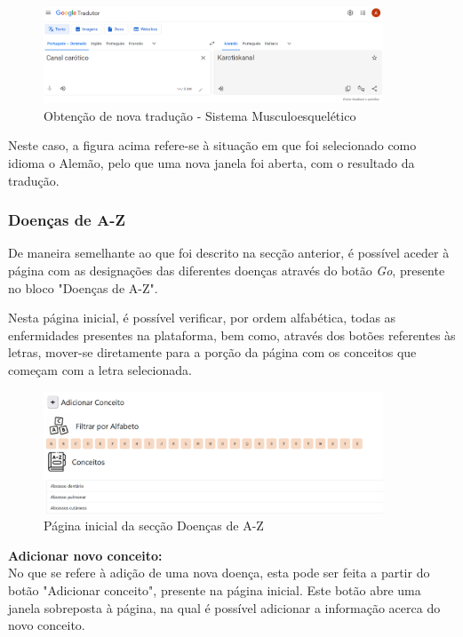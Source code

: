 \begin{figure}[H]
    \centering
    \centering
    \includegraphics[width=0.9\textwidth]{Images/tradutor.png}
    \caption{Obtenção de nova tradução - Sistema Musculoesquelético}
    \label{fig:dic-traduc1}
\end{figure}

Neste caso, a figura acima refere-se à situação em que foi selecionado como idioma o Alemão, pelo que uma nova janela foi aberta, com o resultado da tradução.

\subsubsection{Doenças de A-Z}

De maneira semelhante ao que foi descrito na secção anterior, é possível aceder à página com as designações das diferentes doenças através do botão \textit{Go}, presente no bloco "Doenças de A-Z".

Nesta página inicial, é possível verificar, por ordem alfabética, todas as enfermidades presentes na plataforma, bem como, através dos botões referentes às letras, mover-se diretamente para a porção da página com os conceitos que começam com a letra selecionada.

\begin{figure}[H]
    \centering
    \centering
    \includegraphics[width=0.9\textwidth]{Images/doencas_pag_inicial.png}
    \caption{Página inicial da secção Doenças de A-Z}
    \label{fig:dic-traduc1}
\end{figure}

\textbf{Adicionar novo conceito:}\\

No que se refere à adição de uma nova doença, esta pode ser feita a partir do botão "Adicionar conceito", presente na página inicial. Este botão abre uma janela sobreposta à página, na qual é possível adicionar a informação acerca do novo conceito. 

